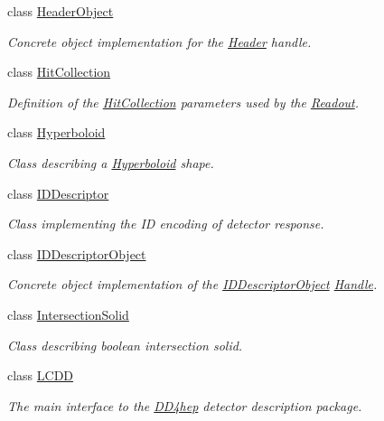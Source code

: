 \begin{DoxyCompactItemize}
class \hyperlink{class_d_d4hep_1_1_geometry_1_1_header_object}{Header\+Object}
\begin{DoxyCompactList}\small\item\em Concrete object implementation for the \hyperlink{class_d_d4hep_1_1_geometry_1_1_header}{Header} handle. \end{DoxyCompactList}\item 
class \hyperlink{class_d_d4hep_1_1_geometry_1_1_hit_collection}{Hit\+Collection}
\begin{DoxyCompactList}\small\item\em Definition of the \hyperlink{class_d_d4hep_1_1_geometry_1_1_hit_collection}{Hit\+Collection} parameters used by the \hyperlink{class_d_d4hep_1_1_geometry_1_1_readout}{Readout}. \end{DoxyCompactList}\item 
class \hyperlink{class_d_d4hep_1_1_geometry_1_1_hyperboloid}{Hyperboloid}
\begin{DoxyCompactList}\small\item\em Class describing a \hyperlink{class_d_d4hep_1_1_geometry_1_1_hyperboloid}{Hyperboloid} shape. \end{DoxyCompactList}\item 
class \hyperlink{class_d_d4hep_1_1_geometry_1_1_i_d_descriptor}{I\+D\+Descriptor}
\begin{DoxyCompactList}\small\item\em Class implementing the ID encoding of detector response. \end{DoxyCompactList}\item 
class \hyperlink{class_d_d4hep_1_1_geometry_1_1_i_d_descriptor_object}{I\+D\+Descriptor\+Object}
\begin{DoxyCompactList}\small\item\em Concrete object implementation of the \hyperlink{class_d_d4hep_1_1_geometry_1_1_i_d_descriptor_object}{I\+D\+Descriptor\+Object} \hyperlink{class_d_d4hep_1_1_handle}{Handle}. \end{DoxyCompactList}\item 
class \hyperlink{class_d_d4hep_1_1_geometry_1_1_intersection_solid}{Intersection\+Solid}
\begin{DoxyCompactList}\small\item\em Class describing boolean intersection solid. \end{DoxyCompactList}\item 
class \hyperlink{class_d_d4hep_1_1_geometry_1_1_l_c_d_d}{L\+C\+DD}
\begin{DoxyCompactList}\small\item\em The main interface to the \hyperlink{namespace_d_d4hep}{D\+D4hep} detector description package. \end{DoxyCompactList}\item 

\end{DoxyCompactItemize}

